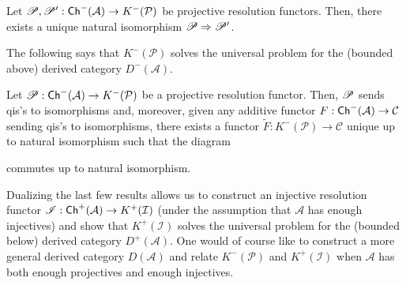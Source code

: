 \documentclass[11pt]{article}
\renewcommand{\A}{\mathcal{A}}
\renewcommand{\C}{\mathcal{C}}
\newcommand{\I}{\mathcal{I}}
\renewcommand{\P}{\mathcal{P}}
\begin{document}
\begin{theorem}[A, Remark 6.8]
Let $\ms{P},\ms{P}': \Ch^-(\A)\to K^-(\P)$ be projective resolution functors. Then, there exists a unique natural isomorphism $\mathscr{P}\Rightarrow\mathscr{P}'$.
\end{theorem}

The following says that $K^-(\P)$ solves the universal problem for the (bounded above) derived category $D^-(\A)$. 

\begin{theorem}[A, Thm 6.9]
Let $\ms{P}: \Ch^-(\A)\to K^-(\P)$ be a projective resolution functor. Then, $\mathscr{P}$ sends qis's to isomorphisms and, moreover, given any additive functor $F: \Ch^-(\A)\to\C$ sending qis's to isomorphisms, there exists a functor $\tilde{F}: K^-(\P)\to\C$ unique up to natural isomorphism such that the diagram
\begin{center}
\end{center}
commutes up to natural isomorphism.
\end{theorem}

Dualizing the last few results allows us to construct an injective resolution functor $\ms{I}: \Ch^+(\A)\to K^+(\I)$ (under the assumption that $\A$ has enough injectives) and show that $K^+(\I)$ solves the universal problem for the (bounded below) derived category $D^+(\A)$. One would of course like to construct a more general derived category $D(\A)$ and relate $K^-(\P)$ and $K^+(\I)$ when $\A$ has both enough projectives and enough injectives.
\end{document}
